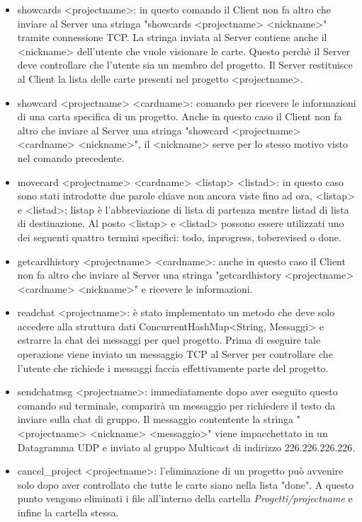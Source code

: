\documentclass{article} %
\begin{document}
\begin{itemize}
    \item showcards <projectname>: in questo comando il Client non fa altro che inviare al Server una stringa "showcards <projectname> <nickname>" tramite connessione TCP. La stringa inviata al Server contiene anche il <nickname> dell'utente che vuole visionare le carte. Questo perchè il Server deve controllare che l'utente sia un membro del progetto. Il Server restituisce al Client la lista delle carte presenti nel progetto <projectname>.
    \item showcard <projectname> <cardname>: comando per ricevere le informazioni di una carta specifica di un progetto. Anche in questo caso il Client non fa altro che inviare al Server una stringa "showcard <projectname> <cardname> <nickname>", il <nickname> serve per lo stesso motivo visto nel comando precedente.
    \item movecard <projectname> <cardname> <listap> <listad>: in questo caso sono stati introdotte due parole chiave non ancora viste fino ad ora, <listap> e <listad>; listap è l'abbreviazione di lista di partenza mentre listad di lista di destinazione. Al posto <listap> e <listad> possono essere utilizzati uno dei seguenti quattro termini specifici: todo, inprogress, toberevised o done. 
    \item getcardhistory <projectname> <cardname>: anche in questo caso il Client non fa altro che inviare al Server una stringa "getcardhistory <projectname> <cardname> <nickname>" e ricevere le informazioni.
    \item readchat <projectname>: è stato implementato un metodo che deve solo accedere alla struttura dati ConcurrentHashMap<String, Messaggi> e estrarre la chat dei messaggi per quel progetto. Prima di eseguire tale operazione viene inviato un messaggio TCP al Server per controllare che l'utente che richiede i messaggi faccia effettivamente parte del progetto.
    \item sendchatmsg <projectname>: immediatamente dopo aver eseguito questo comando sul terminale, comparirà un messaggio per richiedere il testo da inviare sulla chat di gruppo. Il messaggio contentente la stringa "<projectname> <nickname> <messaggio>" viene impacchettato in un Datagramma UDP e inviato al gruppo Multicast di indirizzo 226.226.226.226.
    \item cancel\_project <projectname>: l'eliminazione di un progetto può avvenire solo dopo aver controllato che tutte le carte siano nella lista "done". A questo punto vengono eliminati i file all'interno della cartella {\itshape Progetti/projectname} e infine la cartella stessa.
\end{itemize}
\end{document}
